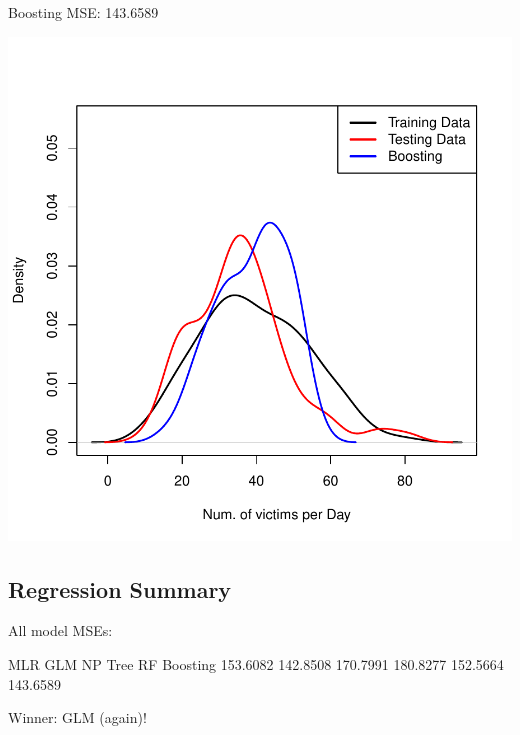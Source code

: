\documentclass[11pt, a4paper]{article}
\begin{document}
\begin{Schunk}
\begin{Soutput}
Boosting MSE: 143.6589
\end{Soutput}
\end{Schunk}
\includegraphics{regression-042}







\pagebreak
\subsection{Regression Summary}


\begin{Schunk}
\begin{Soutput}
All model MSEs:
\end{Soutput}
\begin{Soutput}
      MLR      GLM       NP     Tree       RF Boosting
 153.6082 142.8508 170.7991 180.8277 152.5664 143.6589
\end{Soutput}
\end{Schunk}


\vspace{6pc}


Winner: GLM (again)!
\end{document}
